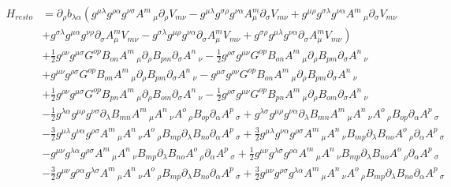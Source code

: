 \documentclass{article}
\numberwithin{equation}{section}
\begin{document}
\begin{equation}
\begin{aligned}
H_{resto}&= \partial_{\rho}{b_{\lambda \alpha}} \left( g^{\mu \lambda} g^{\rho \alpha} g^{\nu \sigma} A^{m}\,_{\mu} \partial_{\rho}{V_{m \nu}} -g^{\mu \lambda} g^{\sigma \rho} g^{\nu \alpha} A^{m}_{\mu} \partial_{\sigma}{V_{m \nu}}+g^{\mu \rho} g^{\sigma \lambda} g^{\nu \alpha} A^{m}\,_{\mu} \partial_{\sigma}{V_{m \nu}} \right.\\
& \left. +g^{\sigma \lambda} g^{\mu \alpha} g^{\nu \rho} \partial_{\sigma}{A^{m}_{\mu}} V_{m \nu} -g^{\sigma \lambda} g^{\mu \rho} g^{\nu \alpha} \partial_{\sigma}{A^{m}_{\mu}} V_{m \nu}+g^{\sigma \rho} g^{\mu \lambda} g^{\nu \alpha} \partial_{\sigma}{A^{m}_{\mu}} V_{m \nu} \right)\\
&+\frac{1}{2} g^{\rho \nu} g^{\mu \sigma} G^{o p} B_{o n} A^{m}\,_{\mu} \partial_{\rho}{B_{p m}} \partial_{\sigma}{A^{n}\,_{\nu}} - \frac{1}{2} g^{\rho \sigma} g^{\mu \nu} G^{o p} B_{o n} A^{m}\,_{\mu} \partial_{\rho}{B_{p m}} \partial_{\sigma}{A^{n}\,_{\nu}}\\
& +g^{\mu \nu} g^{\rho \sigma} G^{o p} B_{o n} A^{m}\,_{\mu}  \partial_{\rho}{B_{p m}} \partial_{\sigma}{A^{n}\,_{\nu}} - g^{\mu \sigma} g^{\rho \nu} G^{o p} B_{o n} A^{m}\,_{\mu}  \partial_{\rho}{B_{p m}} \partial_{\sigma}{A^{n}\,_{\nu}}\\
&+ \frac{1}{2} g^{\rho \nu} g^{\mu \sigma} G^{o p} B_{p n} A^{m}\,_{\mu} \partial_{\rho}{B_{o m}} \partial_{\sigma}{A^{n}\,_{\nu}} - \frac{1}{2}g^{\rho \sigma} g^{\mu \nu} G^{o p} B_{p n} A^{m}\,_{\mu}  \partial_{\rho}{B_{o m}} \partial_{\sigma}{A^{n}\,_{\nu}}\\
&- \frac{1}{2}g^{\lambda \alpha} g^{\mu \rho} g^{\nu \sigma} \partial_{\lambda}{B_{m n}} A^{m}\,_{\mu} A^{n}\,_{\nu} A^{o}\,_{\rho} B_{o p} \partial_{\alpha}{A^{p}\,_{\sigma}}+g^{\lambda \sigma} g^{\mu \rho} g^{\nu \alpha} \partial_{\lambda}{B_{m n}} A^{m}\,_{\mu} A^{n}\,_{\nu} A^{o}\,_{\rho} B_{o p} \partial_{\alpha}{A^{p}\,_{\sigma}}\\
&- \frac{3}{2}g^{\mu \lambda} g^{\nu \alpha} g^{\rho \sigma} A^{m}\,_{\mu} A^{n}\,_{\nu} A^{o}\,_{\rho} B_{m p} \partial_{\lambda}{B_{n o}} \partial_{\alpha}{A^{p}\,_{\sigma}}+\frac{3}{2}g^{\mu \lambda} g^{\nu \alpha} g^{\rho \sigma} A^{m}\,_{\mu} A^{n}\,_{\nu} B_{m p} \partial_{\lambda}{B_{n o}} A^{o}\,_{\rho} \partial_{\alpha}{A^{p}\,_{\sigma}}\\
& -g^{\mu \nu} g^{\lambda \alpha} g^{\rho \sigma} A^{m}\,_{\mu} A^{n}\,_{\nu} B_{m p} \partial_{\lambda}{B_{n o}} A^{o}\,_{\rho} \partial_{\alpha}{A^{p}\,_{\sigma}}+\frac{1}{2}g^{\mu \nu} g^{\lambda \sigma} g^{\rho \alpha} A^{m}\,_{\mu} A^{n}\,_{\nu} B_{m p} \partial_{\lambda}{B_{n o}} A^{o}\,_{\rho} \partial_{\alpha}{A^{p}\,_{\sigma}}\\
&- \frac{3}{2}g^{\mu \nu} g^{\rho \alpha} g^{\lambda \sigma} A^{m}\,_{\mu} A^{n}\,_{\nu} A^{o}\,_{\rho} B_{m p} \partial_{\lambda}{B_{n o}} \partial_{\alpha}{A^{p}\,_{\sigma}}+\frac{3}{2}g^{\mu \nu} g^{\rho \sigma} g^{\lambda \alpha} A^{m}\,_{\mu} A^{n}\,_{\nu} A^{o}\,_{\rho} B_{m p} \partial_{\lambda}{B_{n o}} \partial_{\alpha}{A^{p}\,_{\sigma}}
\end{aligned}
\end{equation}
\end{document}
